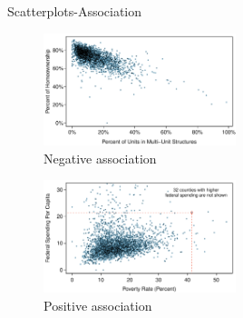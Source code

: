 \documentclass[12pt,a4paper]{beamer}
\begin{document}
\begin{frame}{Scatterplots-Association}
	\begin{figure}
	   \includegraphics[width=0.5\textwidth]{figures/multiunitsVsOwnership/multiunitsVsOwnership}
	   \caption{Negative association}
	   \label{multiunitsVsOwnership}
	\end{figure}
	\begin{figure}
	\includegraphics[width=0.5\textwidth]{figures/county_fed_spendVsPoverty/county_fed_spendVsPoverty}
	\caption{Positive association}
	\label{county_fed_spendVsPoverty}
	\end{figure}
\end{frame}
\end{document}
